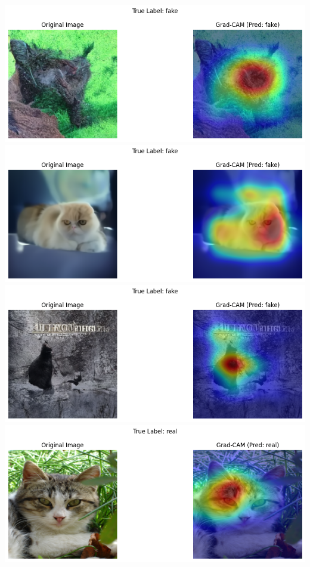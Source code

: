 \documentclass{article}
\begin{document}
\includegraphics[width=0.9\linewidth]{img/sample_fake_0.png}\\
\includegraphics[width=0.9\linewidth]{img/sample_fake_1.png}\\
\includegraphics[width=0.9\linewidth]{img/sample_fake_2.png}\\
\includegraphics[width=0.9\linewidth]{img/sample_real_0.png}\\
\end{document}
